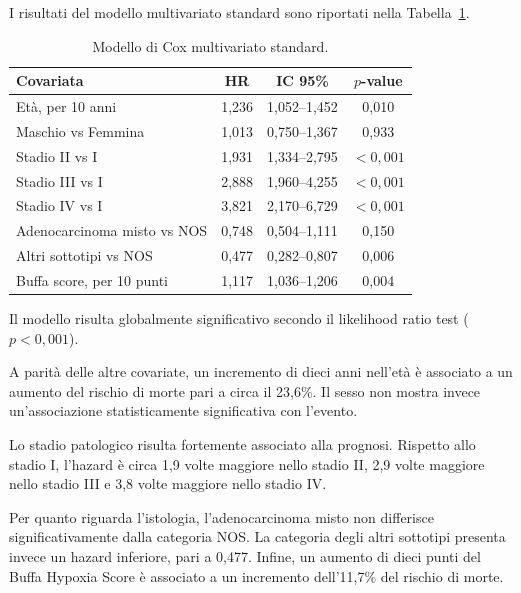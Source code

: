 \documentclass[12pt,a4paper]{article}
\begin{document}
I risultati del modello multivariato standard sono riportati nella Tabella~\ref{tab:cox_standard}.

\begin{table}[H]
\centering
\caption{Modello di Cox multivariato standard.}
\label{tab:cox_standard}
\renewcommand{\arraystretch}{1.15}
\small
\begin{tabular}{l c c c}
\toprule
\textbf{Covariata}
& \textbf{HR}
& \textbf{IC 95\%}
& \textbf{$p$-value} \\
\midrule
Età, per 10 anni
& 1,236
& 1,052--1,452
& 0,010 \\

Maschio vs Femmina
& 1,013
& 0,750--1,367
& 0,933 \\

Stadio II vs I
& 1,931
& 1,334--2,795
& $<0,001$ \\

Stadio III vs I
& 2,888
& 1,960--4,255
& $<0,001$ \\

Stadio IV vs I
& 3,821
& 2,170--6,729
& $<0,001$ \\

Adenocarcinoma misto vs NOS
& 0,748
& 0,504--1,111
& 0,150 \\

Altri sottotipi vs NOS
& 0,477
& 0,282--0,807
& 0,006 \\

Buffa score, per 10 punti
& 1,117
& 1,036--1,206
& 0,004 \\
\bottomrule
\end{tabular}
\end{table}

Il modello risulta globalmente significativo secondo il likelihood ratio test ($p<0,001$).

A parità delle altre covariate, un incremento di dieci anni nell'età è associato a un aumento del rischio di morte pari a circa il 23,6\%. Il sesso non mostra invece un'associazione statisticamente significativa con l'evento.

Lo stadio patologico risulta fortemente associato alla prognosi. Rispetto allo stadio I, l'hazard è circa 1,9 volte maggiore nello stadio II, 2,9 volte maggiore nello stadio III e 3,8 volte maggiore nello stadio IV.

Per quanto riguarda l'istologia, l'adenocarcinoma misto non differisce significativamente dalla categoria NOS. La categoria degli altri sottotipi presenta invece un hazard inferiore, pari a 0,477. Infine, un aumento di dieci punti del Buffa Hypoxia Score è associato a un incremento dell'11,7\% del rischio di morte.
\end{document}

